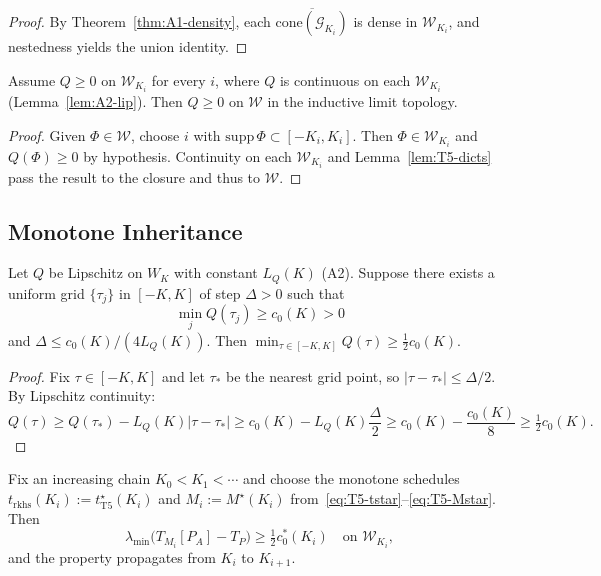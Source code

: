 \begin{proof}
By Theorem~\ref{thm:A1-density}, each $\overline{\mathrm{cone}(\mathcal{G}_{K_i})}$ is dense in $\mathcal{W}_{K_i}$, and nestedness yields the union identity.
\end{proof}

\begin{theorem}\label{thm:T5-transfer}
Assume $Q \geq 0$ on $\mathcal{W}_{K_i}$ for every $i$, where $Q$ is continuous on each $\mathcal{W}_{K_i}$ (Lemma~\ref{lem:A2-lip}). Then $Q \geq 0$ on $\mathcal{W}$ in the inductive limit topology.
\end{theorem}

\begin{proof}
Given $\Phi \in \mathcal{W}$, choose $i$ with $\mathrm{supp}\,\Phi \subset [-K_i, K_i]$. Then $\Phi \in \mathcal{W}_{K_i}$ and $Q(\Phi) \geq 0$ by hypothesis. Continuity on each $\mathcal{W}_{K_i}$ and Lemma~\ref{lem:T5-dicts} pass the result to the closure and thus to $\mathcal{W}$.
\end{proof}

\subsection{Monotone Inheritance}

\begin{lemma}\label{lem:T5-grid-lip}
Let $Q$ be Lipschitz on $W_K$ with constant $L_Q(K)$ (A2). Suppose there exists a uniform grid $\{\tau_j\}$ in $[-K, K]$ of step $\Delta > 0$ such that
\begin{equation}
  \min_j Q(\tau_j) \geq c_0(K) > 0
\end{equation}
and $\Delta \leq c_0(K)/(4 L_Q(K))$. Then $\min_{\tau \in [-K, K]} Q(\tau) \geq \tfrac{1}{2} c_0(K)$.
\end{lemma}

\begin{proof}
Fix $\tau \in [-K, K]$ and let $\tau_\ast$ be the nearest grid point, so $|\tau - \tau_\ast| \leq \Delta/2$. By Lipschitz continuity:
\begin{equation}
  Q(\tau) \geq Q(\tau_\ast) - L_Q(K) |\tau - \tau_\ast| \geq c_0(K) - L_Q(K) \frac{\Delta}{2} \geq c_0(K) - \frac{c_0(K)}{8} \geq \tfrac{1}{2} c_0(K).
\end{equation}
\end{proof}

\begin{lemma}\label{lem:T5-inheritance}
Fix an increasing chain $K_0 < K_1 < \cdots$ and choose the monotone schedules $t_{\mathrm{rkhs}}(K_i) := t^\star_{\mathrm{T5}}(K_i)$ and $M_i := M^\star(K_i)$ from~\eqref{eq:T5-tstar}--\eqref{eq:T5-Mstar}. Then
\begin{equation}
  \lambda_{\min}\big(T_{M_i}[P_A] - T_P\big) \geq \tfrac{1}{2} c_0^\ast(K_i) \quad \text{on } \mathcal{W}_{K_i},
\end{equation}
and the property propagates from $K_i$ to $K_{i+1}$.
\end{lemma}

